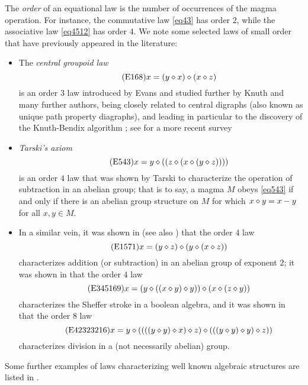 The \emph{order} of an equational law is the number of occurrences of the magma operation.  For instance, the commutative law \eqref{eq43} has order $2$, while the associative law \eqref{eq4512} has order $4$.  We note some selected laws of small order that have previously appeared in the literature:
\begin{itemize}
\item The \emph{central groupoid law}
\begin{equation}\label{eq168}\tag{E168}
x = (y \diamond x) \diamond (x \diamond z)
\end{equation}
is an order $3$ law introduced by Evans \cite{evans} and studied further by Knuth \cite{knuth} and many further authors, being closely related to central digraphs (also known as unique path property diagraphs), and leading in particular to the discovery of the Knuth-Bendix algorithm \cite{knuth-bendix}; see \cite{klt} for a more recent survey
\item \emph{Tarski's axiom}
\begin{equation}\label{eq543}\tag{E543}
    x = y \diamond ( (z \diamond (x \diamond (y \diamond z))))
\end{equation}
is an order $4$ law that was shown by Tarski \cite{Tarski1938} to characterize the operation of subtraction in an abelian group; that is to say, a magma $M$ obeys \eqref{eq543} if and only if there is an abelian group structure on $M$ for which $x \diamond y = x-y$ for all $x,y \in M$.
\item In a similar vein, it was shown in \cite{mendelsohn-padmanabhan} (see also \cite{meredith-prior}) that the order $4$ law
\begin{equation}\label{eq1571}\tag{E1571}
    x = (y \diamond z) \diamond (y \diamond (x \diamond z))
\end{equation}
characterizes addition (or subtraction) in an abelian group of exponent $2$; it was shown in \cite{mccune_et_al} that the order $4$ law
\begin{equation}\label{eq345169}\tag{E345169}
    x = (y \diamond ((x \diamond y) \diamond y)) \diamond (x \diamond (z \diamond y))
\end{equation}
characterizes the Sheffer stroke in a boolean algebra, and it was shown in \cite{higman-neumann} that the order $8$ law
\begin{equation}\label{eq42323216}\tag{E42323216}
x = y \diamond ((((y \diamond y) \diamond x) \diamond z) \diamond (((y \diamond y) \diamond y) \diamond z))
\end{equation}
characterizes division in a (not necessarily abelian) group.
\end{itemize}
Some further examples of laws characterizing well known algebraic structures are listed in \cite{mccune-survey}.

